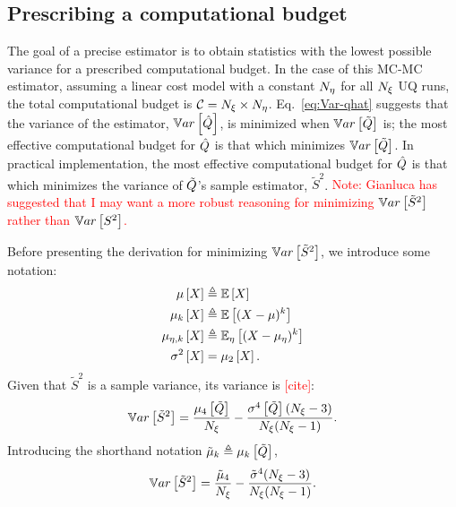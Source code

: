 \subsection{Prescribing a computational budget} %
The goal of a precise estimator is to obtain statistics with the lowest possible variance for a prescribed computational budget. In the case of this MC-MC estimator, assuming a linear cost model with a constant ${N_\eta}$ for all ${N_\xi}$ UQ runs, the total computational budget is $\mathcal{C}={N_\xi} \times {N_\eta}$. Eq.~\eqref{eq:Var-qhat} suggests that the variance of the estimator, $\mathbb{V}ar\left[\hat{Q}\right]$, is minimized when $\mathbb{V}ar\left[\tilde{Q}\right]$ is; the most effective computational budget for $\hat{Q}$ is that which minimizes $\mathbb{V}ar\left[\tilde{Q}\right]$. In practical implementation, the most effective computational budget for $\hat{Q}$ is that which minimizes the variance of $\tilde{Q}$'s sample estimator, $\tilde{S}^2$. \textcolor{red}{Note: Gianluca has suggested that I may want a more robust reasoning for minimizing $\mathbb{V}ar\left[\tilde{S}^2\right]$ rather than $\mathbb{V}ar\left[S^2\right]$.}

\noindent Before presenting the derivation for minimizing $\mathbb{V}ar\left[\tilde{S}^2\right]$, we introduce some notation:
\begin{equation}
    \begin{split}
        \mu\left[ X \right] &\triangleq \mathbb{E}\left[ X \right] \\
        \mu_k\left[ X \right] &\triangleq \mathbb{E}\left[ (X-\mu)^k \right] \\
        \mu_{\eta,k}\left[ X \right] &\triangleq \mathbb{E}_\eta\left[ (X-\mu_\eta)^k \right] \\
        \sigma^2\left[ X \right] &= \mu_2\left[ X \right] .
    \end{split}
\end{equation}
Given that $\tilde{S}^2$ is a sample variance, its variance is \textcolor{red}{[cite]}:
\begin{equation}
    \mathbb{V}ar\left[\tilde{S}^2\right] = \frac{\mu_4\left[\tilde{Q}\right]}{{N_\xi}} - \frac{ \sigma^4\left[\tilde{Q}\right]({N_\xi}-3) }{ {N_\xi} ({N_\xi}-1) }.
\end{equation}
Introducing the shorthand notation $\tilde{\mu}_k \triangleq \mu_k\left[\tilde{Q}\right]$, 
\begin{equation}\label{eq:var-s2-tilde}
    \mathbb{V}ar\left[\tilde{S}^2\right] = \frac{\tilde{\mu}_4}{{N_\xi}} - \frac{ \tilde{\sigma}^4 ({N_\xi}-3) }{ {N_\xi} ({N_\xi}-1) }.
\end{equation}

